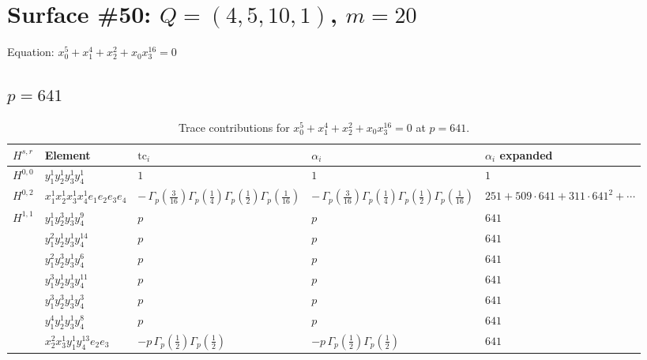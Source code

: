 \documentclass[11pt]{article}
\begin{document}
\newpage

\section*{Surface \#50: $Q=(4, 5, 10, 1)$, $m=20$}

Equation: $x_0^{5} + x_1^{4} + x_2^{2} + x_0 x_3^{16} = 0$

\subsection*{$p = 641$}

\begin{table}[ht]
\centering
\caption{Trace contributions for $x_0^{5} + x_1^{4} + x_2^{2} + x_0 x_3^{16} = 0$ at $p=641$.}\label{tab:deformed-50}
\renewcommand{\arraystretch}{1.1}
{\scriptsize
\begin{tabular}{@{}lllll@{}}
\toprule
$H^{s,r}$ & Element & $\mathrm{tc}_i$ & $\alpha_i$ & $\alpha_i$ expanded \\
\midrule
$H^{0,0}$ & $y_{1}^{1} y_{2}^{1} y_{3}^{1} y_{4}^{1}$ & $1$ & $1$ & $1$ \\
\midrule
$H^{0,2}$ & $x_{1}^{1} x_{2}^{1} x_{3}^{1} x_{4}^{1}  e_{1} e_{2} e_{3} e_{4}$ & $- \, \Gamma_p \left( \frac{3}{16} \right) \Gamma_p \left( \frac{1}{4} \right) \Gamma_p \left( \frac{1}{2} \right) \Gamma_p \left( \frac{1}{16} \right)$ & $- \, \Gamma_p \left( \frac{3}{16} \right) \Gamma_p \left( \frac{1}{4} \right) \Gamma_p \left( \frac{1}{2} \right) \Gamma_p \left( \frac{1}{16} \right)$ & $251{+}509{\cdot}641{+}311{\cdot}641^{2}{+}\cdots$ \\
\midrule
$H^{1,1}$ & $y_{1}^{1} y_{2}^{3} y_{3}^{1} y_{4}^{9}$ & $p \,$ & $p \,$ & $641$ \\
 & $y_{1}^{2} y_{2}^{1} y_{3}^{1} y_{4}^{14}$ & $p \,$ & $p \,$ & $641$ \\
 & $y_{1}^{2} y_{2}^{3} y_{3}^{1} y_{4}^{6}$ & $p \,$ & $p \,$ & $641$ \\
 & $y_{1}^{3} y_{2}^{1} y_{3}^{1} y_{4}^{11}$ & $p \,$ & $p \,$ & $641$ \\
 & $y_{1}^{3} y_{2}^{3} y_{3}^{1} y_{4}^{3}$ & $p \,$ & $p \,$ & $641$ \\
 & $y_{1}^{4} y_{2}^{1} y_{3}^{1} y_{4}^{8}$ & $p \,$ & $p \,$ & $641$ \\
 & $x_{2}^{2} x_{3}^{1} y_{1}^{1} y_{4}^{13} e_{2} e_{3}$ & $- p \, \Gamma_p \left( \frac{1}{2} \right) \Gamma_p \left( \frac{1}{2} \right)$ & $- p \, \Gamma_p \left( \frac{1}{2} \right) \Gamma_p \left( \frac{1}{2} \right)$ & $641$ \\

\end{tabular}}
\end{table}
\end{document}
